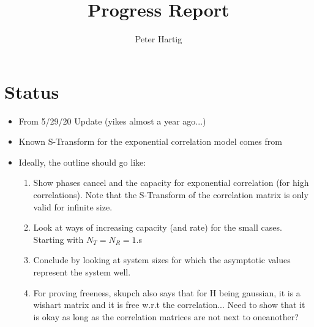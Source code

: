 \documentclass[12pt,a4paper]{report}
\title{Progress Report}
\author{Peter Hartig}
\begin{document}
\maketitle
\tableofcontents

\section{Status}
\begin{itemize}
\item
From 5/29/20 Update (yikes almost a year ago...)
\item
Known S-Transform for the exponential correlation model comes from \cite{skupch2005free}
\item
Ideally, the outline should go like:
\begin{enumerate}
\item 
 Show phases cancel and the capacity for exponential correlation (for high correlations). Note that the S-Transform of the correlation matrix is only valid for infinite size.
\item 
Look at ways of increasing capacity (and rate) for the small cases. Starting with $N_T = N_R = 1$.s
\item 
Conclude by looking at system sizes for which the asymptotic values represent the system well.
\item
For proving freeness, skupch also says that for H being gaussian, it is a wishart matrix and it is free w.r.t the correlation... Need to show that it is okay as long as the correlation matrices are not next to oneanother?
\end{enumerate}
\end{itemize}

\end{document}
